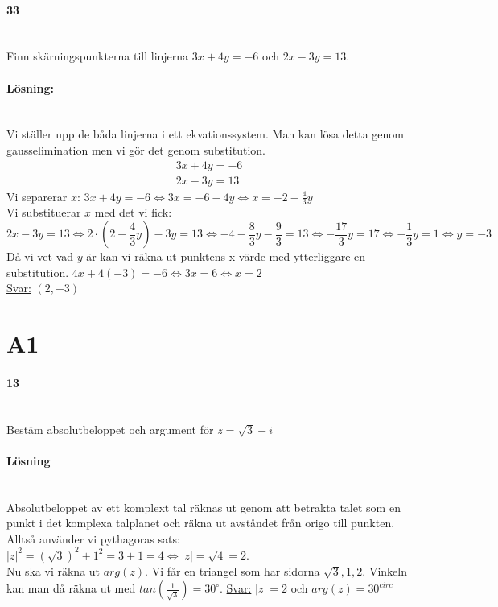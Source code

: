 \paragraph{33}~\\
Finn skärningspunkterna till linjerna $3x+4y=-6$ och $2x-3y=13$.
\paragraph{Lösning:}~\\
Vi ställer upp de båda linjerna i ett ekvationssystem.
Man kan lösa detta genom gausselimination men vi gör det genom substitution.
\begin{equation*}
    \begin{matrix}
        3x+4y=-6 \\
        2x-3y=13
    \end{matrix}
\end{equation*}
Vi separerar $x$:
$3x+4y=-6\Leftrightarrow 3x=-6-4y\Leftrightarrow x=-2-\frac{4}{3}y$\\
Vi substituerar $x$ med det vi fick:
\begin{equation*}
    2x-3y=13\Leftrightarrow
    2\cdot(2-\frac{4}{3}y)-3y=13\Leftrightarrow
    -4-\frac{8}{3}y-\frac{9}{3}=13\Leftrightarrow
    -\frac{17}{3}y=17\Leftrightarrow
    -\frac{1}{3}y=1\Leftrightarrow y=-3
\end{equation*}
Då vi vet vad $y$ är kan vi räkna ut punktens x värde med ytterliggare en substitution.
$4x+4(-3)=-6\Leftrightarrow 3x=6\Leftrightarrow x=2$\\
\underline{Svar:} $(2, -3)$

\section*{A1}
\paragraph{13}~\\
Bestäm absolutbeloppet och argument för $z=\sqrt{3}-i$

\paragraph{Lösning}~\\
Absolutbeloppet av ett komplext tal räknas ut genom att betrakta talet
som en punkt i det komplexa talplanet och räkna ut avståndet från origo
till punkten.\\
Alltså använder vi pythagoras sats:
$|z|^2=(\sqrt{3})^2+1^2=3+1=4\Leftrightarrow |z|=\sqrt{4}=2$.\\
Nu ska vi räkna ut $arg(z)$.
Vi får en triangel som har sidorna $\sqrt{3},1,2$.
Vinkeln kan man då räkna ut med $tan(\frac{1}{\sqrt{3}})=30^\circ$.
\underline{Svar:} $|z|=2$ och $arg(z)=30^{circ}$
